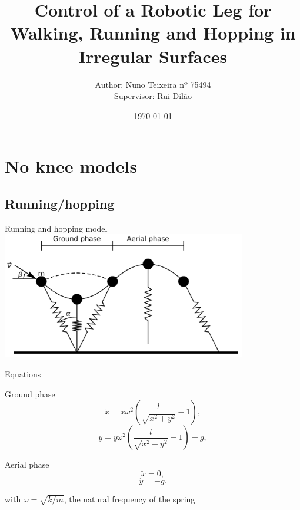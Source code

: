 \documentclass{beamer}
\title[PMEFT]{Control of a Robotic Leg for Walking, Running and Hopping in Irregular Surfaces}
\author{Author: Nuno Teixeira nº 75494 \\ Supervisor: Rui Dilão}
\institute{Projecto MEFT \\Instituto Superior Técnico}
\date{\today}
\begin{document}
\begin{frame}
  \titlepage
\end{frame}

\section{No knee models}
\subsection{Running/hopping}
\centering
\begin{frame}{Running and hopping model}
  \centering
\includegraphics[width=0.8\textwidth]{Blickhan_model.png}
\end{frame}

\begin{frame}{Equations}
  \begin{block}{Ground phase}
  \begin{equation}
  \ddot{x}=x\omega^2\left(\frac{l}{\sqrt{x^2+y^2}}-1\right),
\end{equation}
\begin{equation}
  \ddot{y}=y\omega^2\left(\frac{l}{\sqrt{x^2+y^2}}-1\right)-g,
\end{equation}
\end{block}

\begin{block}{Aerial phase}
\begin{equation}
  \ddot{x}=0,
\end{equation}
\begin{equation}
  \ddot{y}=-g.
  \end{equation}
\end{block}
with $\omega=\sqrt{k/m}$, the natural frequency of the spring
\end{frame}
\end{document}
